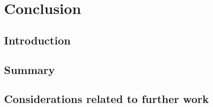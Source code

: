\chapter{Conclusion}


\section{Introduction}

\section{Summary}

\section{Considerations related to further work}

